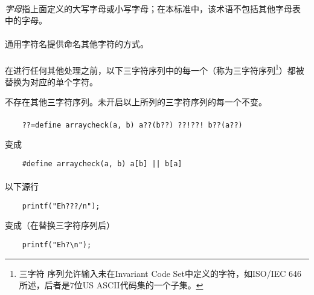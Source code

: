 \paragraph{}
\textit{字母}指上面定义的大写字母或小写字母；在本标准中，该术语不包括其他字母表
中的字母。

\paragraph{}
通用字符名提供命名其他字符的方式。


\paragraph{}
在进行任何其他处理之前，以下三字符序列中的每一个（称为三字符序列\footnote{三字符
序列允许输入未在Invariant Code Set中定义的字符，如ISO/IEC 646所述，后者是$7$位US
ASCII代码集的一个子集。}）都被替换为对应的单个字符。

\mbox{\qquad\tm{??=\quad\#\qquad\qquad??)\quad]\qquad\qquad??!\quad|}}

\mbox{\qquad\tm{??(\quad[\qquad\qquad??\sq\quad\^\qquad\qquad??>\quad\}}}

\mbox{\qquad{}}

不存在其他三字符序列。未开启以上所列的三字符序列的每一个不变。

\paragraph{}
\ex
\begin{lstlisting}
    ??=define arraycheck(a, b) a??(b??) ??!??! b??(a??)
\end{lstlisting}
变成
\begin{lstlisting}
    #define arraycheck(a, b) a[b] || b[a]
\end{lstlisting}

\paragraph{}
\ex 以下源行
\begin{lstlisting}
    printf("Eh???/n");
\end{lstlisting}
变成（在替换三字符序列后）
\begin{lstlisting}
    printf("Eh?\n");
\end{lstlisting}

